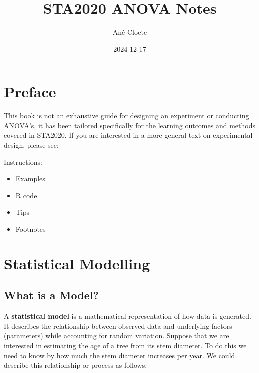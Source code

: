 \documentclass[
  letterpaper,
  DIV=11,
  numbers=noendperiod,
  oneside]{scrreprt}
\title{STA2020 ANOVA Notes}
\author{Ané Cloete}
\date{2024-12-17}
\providecommand{\tightlist}{%
  \setlength{\itemsep}{0pt}\setlength{\parskip}{0pt}}\usepackage{longtable,booktabs,array}
\renewcommand*\contentsname{Table of contents}
\newcommand\contentsname{Table of contents}
\begin{document}
\maketitle

\renewcommand*\contentsname{Table of contents}
{
\hypersetup{linkcolor=}
\setcounter{tocdepth}{2}
\tableofcontents
}


\chapter*{Preface}\label{preface}


This book is not an exhaustive guide for designing an experiment or
conducting ANOVA's, it has been tailored specifically for the learning
outcomes and methods covered in STA2020. If you are interested in a more
general text on experimental design, please see:

Instructions:

\begin{itemize}
\tightlist
\item
  Examples
\item
  R code
\item
  Tips
\item
  Footnotes
\end{itemize}


\chapter*{Statistical Modelling}\label{statistical-modelling}


\section*{What is a Model?}\label{what-is-a-model}


A \textbf{statistical model} is a mathematical representation of how
data is generated. It describes the relationship between observed data
and underlying factors (parameters) while accounting for random
variation. Suppose that we are interested in estimating the age of a
tree from its stem diameter. To do this we need to know by how much the
stem diameter increases per year. We could describe this relationship or
process as follows:
\end{document}
